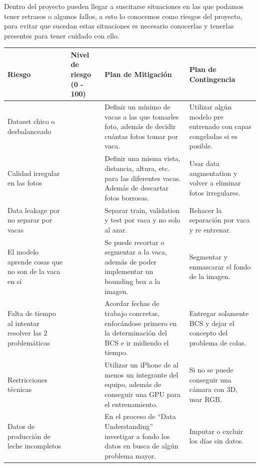 \documentclass[11pt,letterpaper,DIV=12]{scrartcl}
\begin{document}


Dentro del proyecto pueden llegar a suscitarse situaciones en las que podamos tener retrasos o algunos fallos, a esto lo conocemos como riesgos del proyecto, para evitar que sucedan estas situaciones es necesario conocerlas y tenerlas presentes para tener cuidado con ello.

\noindent
\begin{tabularx}{\textwidth}{>{\raggedright\arraybackslash}X>{\raggedright\arraybackslash}p{1.8cm}>{\raggedright\arraybackslash}X>{\raggedright\arraybackslash}X}
  \toprule
  Riesgo & Nivel de riesgo (0 - 100) & Plan de Mitigación & Plan de Contingencia \\
  \midrule
  Dataset chico o desbalanceado & 85 & Definir un mínimo de vacas a las que tomarles foto, además de decidir cuántas fotos tomar por vaca. & Utilizar algún modelo pre entrenado con capas congeladas si es posible. \\
  \addlinespace
  Calidad irregular en las fotos & 80 & Definir una misma vista, distancia, altura, etc. para las diferentes vacas. Además de descartar fotos borrosas. & Usar data augmentation y volver a eliminar fotos irregulares. \\
  \addlinespace
  Data leakage por no separar por vacas & 80 & Separar train, validation y test por vaca y no solo al azar. & Rehacer la separación por vaca y re entrenar. \\
  \addlinespace
  El modelo aprende cosas que no son de la vaca en sí & 75 & Se puede recortar o segmentar a la vaca, además de poder implementar un bounding box a la imagen. & Segmentar y enmascarar el fondo de la imagen. \\
  \addlinespace
  Falta de tiempo al intentar resolver las 2 problemáticas & 70 & Acordar fechas de trabajo concretas, enfocándose primero en la determinación del BCS e ir midiendo el tiempo. & Entregar solamente BCS y dejar el concepto del problema de colas. \\
  \addlinespace
  Restricciones técnicas & 60 & Utilizar un iPhone de al menos un integrante del equipo, además de conseguir una GPU para el entrenamiento. & Si no se puede conseguir una cámara con 3D, usar RGB. \\
  \addlinespace
  Datos de producción de leche incompletos & 55 & En el proceso de ``Data Understanding'' investigar a fondo los datos en busca de algún problema mayor. & Imputar o excluir los días sin datos. \\
  \bottomrule
\end{tabularx}

\printbibliography
\end{document}
